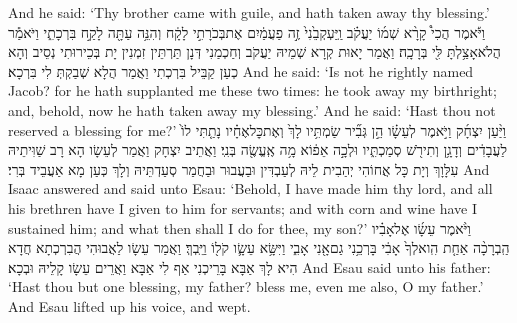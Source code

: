 {And he said: ‘Thy brother came with guile, and hath taken away thy blessing.’}{}
{וַיֹּ֡אמֶר הֲכִי֩ קָרָ֨א שְׁמ֜וֹ יַעֲקֹ֗ב וַֽיַּעְקְבֵ֙נִי֙ זֶ֣ה פַעֲמַ֔יִם אֶת\maqqaf בְּכֹרָתִ֣י לָקָ֔ח וְהִנֵּ֥ה עַתָּ֖ה לָקַ֣ח בִּרְכָתִ֑י וַיֹּאמַ֕ר הֲלֹא\maqqaf אָצַ֥לְתָּ לִּ֖י בְּרָכָֽה׃}
{וַאֲמַר יָאוּת קְרָא שְׁמֵיהּ יַעֲקֹב וְחַכְמַנִי דְּנָן תַּרְתֵּין זִמְנִין יָת בְּכֵירוּתִי נְסֵיב וְהָא כְעַן קַבֵּיל בִּרְכְתִי וַאֲמַר הֲלָא שְׁבַקְתְּ לִי בִּרְכָא׃}
{And he said: ‘Is not he rightly named Jacob? for he hath supplanted me these two times: he took away my birthright; and, behold, now he hath taken away my blessing.’ And he said: ‘Hast thou not reserved a blessing for me?’}{}
{וַיַּ֨עַן יִצְחָ֜ק וַיֹּ֣אמֶר לְעֵשָׂ֗ו הֵ֣ן גְּבִ֞יר שַׂמְתִּ֥יו לָךְ֙ וְאֶת\maqqaf כׇּל\maqqaf אֶחָ֗יו נָתַ֤תִּי לוֹ֙ לַעֲבָדִ֔ים וְדָגָ֥ן וְתִירֹ֖שׁ סְמַכְתִּ֑יו וּלְכָ֣ה אֵפ֔וֹא מָ֥ה אֶֽעֱשֶׂ֖ה בְּנִֽי׃}
{וַאֲתֵיב יִצְחָק וַאֲמַר לְעֵשָׂו הָא רָב שַׁוִּיתֵיהּ עִלָּוָךְ וְיָת כָּל אֲחוֹהִי יְהַבִית לֵיהּ לְעַבְדִּין וּבַעֲבוּר וּבַחֲמַר סְעַדְתֵּיהּ וְלָךְ כְּעַן מָא אַעֲבֵיד בְּרִי׃}
{And Isaac answered and said unto Esau: ‘Behold, I have made him thy lord, and all his brethren have I given to him for servants; and with corn and wine have I sustained him; and what then shall I do for thee, my son?’}{}
{וַיֹּ֨אמֶר עֵשָׂ֜ו אֶל\maqqaf אָבִ֗יו הַֽבְרָכָ֨ה אַחַ֤ת הִֽוא\maqqaf לְךָ֙ אָבִ֔י בָּרְכֵ֥נִי גַם\maqqaf אָ֖נִי אָבִ֑י וַיִּשָּׂ֥א עֵשָׂ֛ו קֹל֖וֹ וַיֵּֽבְךְּ׃}
{וַאֲמַר עֵשָׂו לַאֲבוּהִי הֲבִרְכְתָא חֲדָא הִיא לָךְ אַבָּא בָּרֵיכְנִי אַף לִי אַבָּא וַאֲרֵים עֵשָׂו קָלֵיהּ וּבְכָא׃}
{And Esau said unto his father: ‘Hast thou but one blessing, my father? bless me, even me also, O my father.’ And Esau lifted up his voice, and wept.}{}
